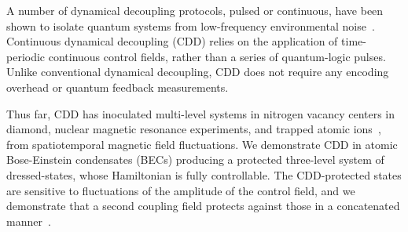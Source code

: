 A number of dynamical decoupling protocols, pulsed or continuous, have been shown to isolate quantum systems from low-frequency environmental noise~\cite{cohen_continuous_2017,fanchini_continuously_2007,aharon_fully_2016,biercuk_optimized_2009,cai_robust_2012,bermudez_robust_2012,baumgart_ultrasensitive_2016,kazakov_magic_2015,sarkany_controlling_2014}.
Continuous dynamical decoupling (CDD) relies on the application of time-periodic continuous control fields, rather than a series of quantum-logic pulses.
Unlike conventional dynamical decoupling, CDD does not require any encoding overhead or quantum feedback measurements.

Thus far, CDD has inoculated multi-level systems in nitrogen vacancy centers in diamond, nuclear magnetic resonance experiments, and trapped atomic ions~\cite{laucht_dressed_2017,farfurnik_experimental_2017,noguchi_generation_2012,golter_protecting_2014,timoney_quantum_2011,webster_simple_2013,barfuss_strong_2015,rohr_synchronizing_2014}, from spatiotemporal magnetic field fluctuations.
We demonstrate CDD in atomic Bose-Einstein condensates (BECs) producing a protected three-level system of dressed-states, whose Hamiltonian is fully controllable.
The CDD-protected states are sensitive to fluctuations of the amplitude of the control field, and we  demonstrate that a second coupling field protects against those in a concatenated manner~\cite{cohen_continuous_2017,farfurnik_experimental_2017,cai_robust_2012}.
